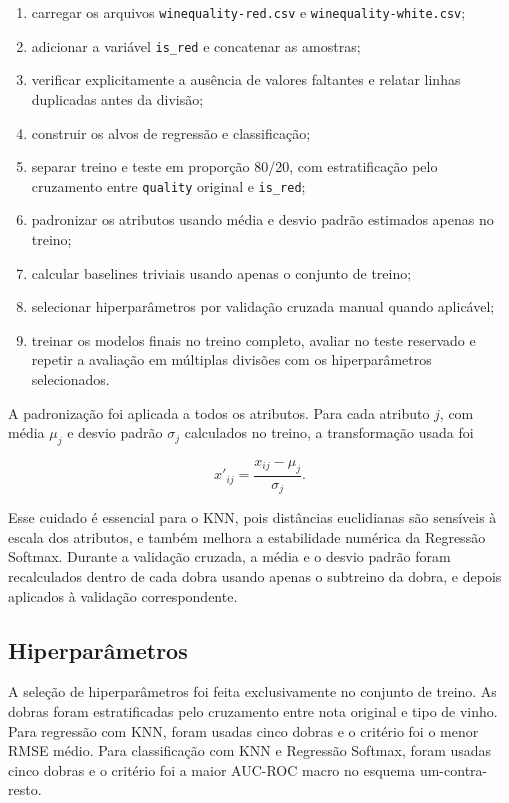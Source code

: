 \documentclass[12pt,a4paper]{article}
\begin{document}
\begin{enumerate}
    \item carregar os arquivos \texttt{winequality-red.csv} e \texttt{winequality-white.csv};
    \item adicionar a vari\'avel \texttt{is\_red} e concatenar as amostras;
    \item verificar explicitamente a aus\^encia de valores faltantes e relatar linhas duplicadas antes da divis\~ao;
    \item construir os alvos de regress\~ao e classifica\c{c}\~ao;
    \item separar treino e teste em propor\c{c}\~ao 80/20, com estratifica\c{c}\~ao pelo cruzamento entre \texttt{quality} original e \texttt{is\_red};
    \item padronizar os atributos usando m\'edia e desvio padr\~ao estimados apenas no treino;
    \item calcular baselines triviais usando apenas o conjunto de treino;
    \item selecionar hiperpar\^ametros por valida\c{c}\~ao cruzada manual quando aplic\'avel;
    \item treinar os modelos finais no treino completo, avaliar no teste reservado e repetir a avalia\c{c}\~ao em m\'ultiplas divis\~oes com os hiperpar\^ametros selecionados.
\end{enumerate}

A padroniza\c{c}\~ao foi aplicada a todos os atributos. Para cada atributo $j$, com m\'edia $\mu_j$ e desvio padr\~ao $\sigma_j$ calculados no treino, a transforma\c{c}\~ao usada foi

\begin{equation}
x'_{ij} = \frac{x_{ij} - \mu_j}{\sigma_j}.
\label{eq:standardization}
\end{equation}

Esse cuidado \'e essencial para o KNN, pois dist\^ancias euclidianas s\~ao sens\'iveis \`a escala dos atributos, e tamb\'em melhora a estabilidade num\'erica da Regress\~ao Softmax. Durante a valida\c{c}\~ao cruzada, a m\'edia e o desvio padr\~ao foram recalculados dentro de cada dobra usando apenas o subtreino da dobra, e depois aplicados \`a valida\c{c}\~ao correspondente.

\subsection{Hiperpar\^ametros}
\label{subsec:hiperparametros}

A sele\c{c}\~ao de hiperpar\^ametros foi feita exclusivamente no conjunto de treino. As dobras foram estratificadas pelo cruzamento entre nota original e tipo de vinho. Para regress\~ao com KNN, foram usadas cinco dobras e o crit\'erio foi o menor RMSE m\'edio. Para classifica\c{c}\~ao com KNN e Regress\~ao Softmax, foram usadas cinco dobras e o crit\'erio foi a maior AUC-ROC macro no esquema um-contra-resto.
\end{document}
